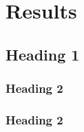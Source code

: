 \chapter[Results]{Results}
\label{Chap:Results}




\section{Heading 1}

\subsection{Heading 2}
\lipsum[4] %

\subsection{Heading 2}
\lipsum[4]

